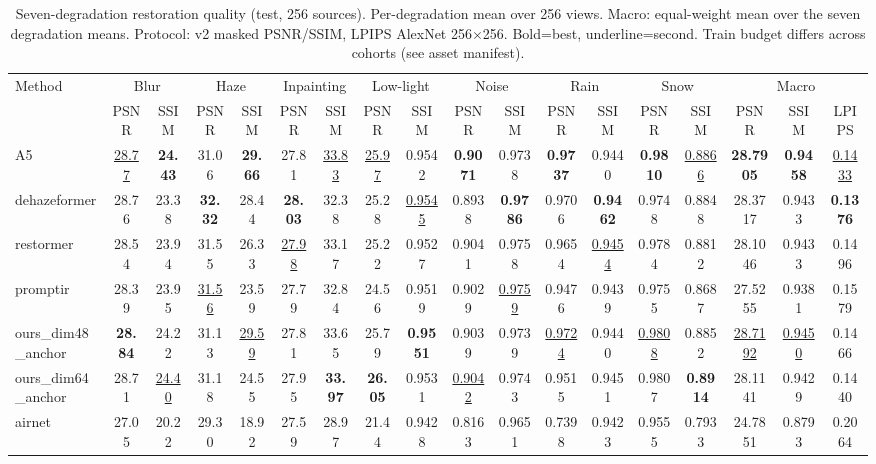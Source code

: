 \begin{table}[t]
\centering
\caption{Seven-degradation restoration quality (test, 256 sources). Per-degradation mean over 256 views. Macro: equal-weight mean over the seven degradation means. Protocol: v2 masked PSNR/SSIM, LPIPS AlexNet 256$\times$256. Bold=best, underline=second. Train budget differs across cohorts (see asset manifest).}
\begin{tabular}{lccccccccccccccccc}
\toprule
Method & \multicolumn{2}{c}{Blur} & \multicolumn{2}{c}{Haze} & \multicolumn{2}{c}{Inpainting} & \multicolumn{2}{c}{Low-light} & \multicolumn{2}{c}{Noise} & \multicolumn{2}{c}{Rain} & \multicolumn{2}{c}{Snow} & \multicolumn{3}{c}{Macro} \\
 & PSNR & SSIM & PSNR & SSIM & PSNR & SSIM & PSNR & SSIM & PSNR & SSIM & PSNR & SSIM & PSNR & SSIM & PSNR & SSIM & LPIPS \\
\midrule
A5 & \underline{28.77} & \textbf{24.43} & 31.06 & \textbf{29.66} & 27.81 & \underline{33.83} & \underline{25.97} & 0.9542 & \textbf{0.9071} & 0.9738 & \textbf{0.9737} & 0.9440 & \textbf{0.9810} & \underline{0.8866} & \textbf{28.7905} & \textbf{0.9458} & \underline{0.1433} \\
dehazeformer & 28.76 & 23.38 & \textbf{32.32} & 28.44 & \textbf{28.03} & 32.38 & 25.28 & \underline{0.9545} & 0.8938 & \textbf{0.9786} & 0.9706 & \textbf{0.9462} & 0.9748 & 0.8848 & 28.3717 & 0.9433 & \textbf{0.1376} \\
restormer & 28.54 & 23.94 & 31.55 & 26.33 & \underline{27.98} & 33.17 & 25.22 & 0.9527 & 0.9041 & 0.9758 & 0.9654 & \underline{0.9454} & 0.9784 & 0.8812 & 28.1046 & 0.9433 & 0.1496 \\
promptir & 28.39 & 23.95 & \underline{31.56} & 23.59 & 27.79 & 32.84 & 24.56 & 0.9519 & 0.9029 & \underline{0.9759} & 0.9476 & 0.9439 & 0.9755 & 0.8687 & 27.5255 & 0.9381 & 0.1579 \\
ours_dim48_anchor & \textbf{28.84} & 24.22 & 31.13 & \underline{29.59} & 27.81 & 33.65 & 25.79 & \textbf{0.9551} & 0.9039 & 0.9739 & \underline{0.9724} & 0.9440 & \underline{0.9808} & 0.8852 & \underline{28.7192} & \underline{0.9450} & 0.1466 \\
ours_dim64_anchor & 28.71 & \underline{24.40} & 31.18 & 24.55 & 27.95 & \textbf{33.97} & \textbf{26.05} & 0.9531 & \underline{0.9042} & 0.9743 & 0.9515 & 0.9451 & 0.9807 & \textbf{0.8914} & 28.1141 & 0.9429 & 0.1440 \\
airnet & 27.05 & 20.22 & 29.30 & 18.92 & 27.59 & 28.97 & 21.44 & 0.9428 & 0.8163 & 0.9651 & 0.7398 & 0.9423 & 0.9555 & 0.7933 & 24.7851 & 0.8793 & 0.2064 \\

\end{tabular}
\end{table}
